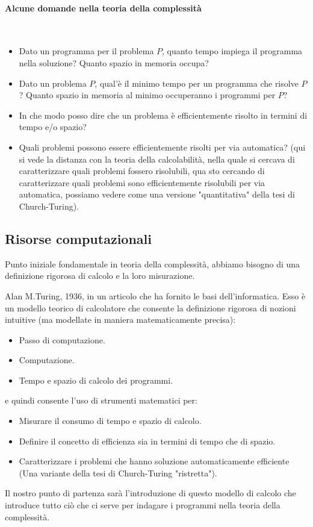 \documentclass{article}
\begin{document}
\paragraph{Alcune domande nella teoria della complessità}\mbox{}\\
\begin{itemize}
    \item Dato un programma per il problema $P$, quanto tempo impiega
          il programma nella soluzione? Quanto spazio in memoria occupa?

    \item Dato un problema $P$, qual'è il minimo tempo per
          un programma che risolve $P$? Quanto spazio in memoria
          al minimo occuperanno i programmi per $P$?

    \item In che modo posso dire che un problema è efficientemente
          risolto in termini di tempo e/o spazio?

    \item Quali problemi possono essere efficientemente risolti per
          via automatica? (qui si vede la distanza con la teoria della
          calcolabilità, nella quale si cercava di caratterizzare
          quali problemi fossero risolubili, qua sto cercando di caratterizzare
          quali problemi sono efficientemente risolubili per via automatica,
          possiamo vedere come una versione "quantitativa" della tesi di
          Church-Turing).
\end{itemize}

\subsection{Risorse computazionali}
Punto iniziale fondamentale in teoria della complessità, abbiamo bisogno
di una definizione rigorosa di calcolo e la loro misurazione.

Alan M.Turing, 1936, in un articolo che ha fornito le basi dell'informatica.
Esso è un modello teorico di calcolatore che consente la definizione
rigorosa di nozioni intuitive (ma modellate in maniera matematicamente
precisa):

\begin{itemize}
    \item Passo di computazione.
    \item Computazione.
    \item Tempo e spazio di calcolo dei programmi.
\end{itemize}
e quindi consente l'uso di strumenti matematici per:
\begin{itemize}
    \item Misurare il consumo di tempo e spazio di calcolo.
    \item Definire il concetto di efficienza sia in termini di tempo
          che di spazio.
    \item Caratterizzare i problemi che hanno soluzione automaticamente
          efficiente (Una variante della tesi di Church-Turing "ristretta").
\end{itemize}
Il nostro punto di partenza sarà l'introduzione di questo modello di calcolo
che introduce tutto ciò che ci serve per indagare i programmi nella teoria della complessità.
\end{document}
